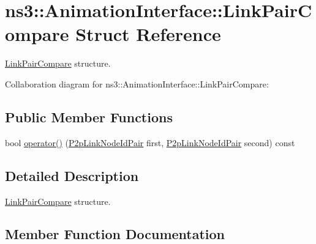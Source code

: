 \hypertarget{structns3_1_1AnimationInterface_1_1LinkPairCompare}{}\section{ns3\+:\+:Animation\+Interface\+:\+:Link\+Pair\+Compare Struct Reference}
\label{structns3_1_1AnimationInterface_1_1LinkPairCompare}


\hyperlink{structns3_1_1AnimationInterface_1_1LinkPairCompare}{Link\+Pair\+Compare} structure.  




Collaboration diagram for ns3\+:\+:Animation\+Interface\+:\+:Link\+Pair\+Compare\+:
\subsection*{Public Member Functions}
\begin{DoxyCompactItemize}
\item 
bool \hyperlink{structns3_1_1AnimationInterface_1_1LinkPairCompare_a368e03076763acb3e1489637456ea469}{operator()} (\hyperlink{structns3_1_1AnimationInterface_1_1P2pLinkNodeIdPair}{P2p\+Link\+Node\+Id\+Pair} first, \hyperlink{structns3_1_1AnimationInterface_1_1P2pLinkNodeIdPair}{P2p\+Link\+Node\+Id\+Pair} second) const 
\end{DoxyCompactItemize}


\subsection{Detailed Description}
\hyperlink{structns3_1_1AnimationInterface_1_1LinkPairCompare}{Link\+Pair\+Compare} structure. 

\subsection{Member Function Documentation}
